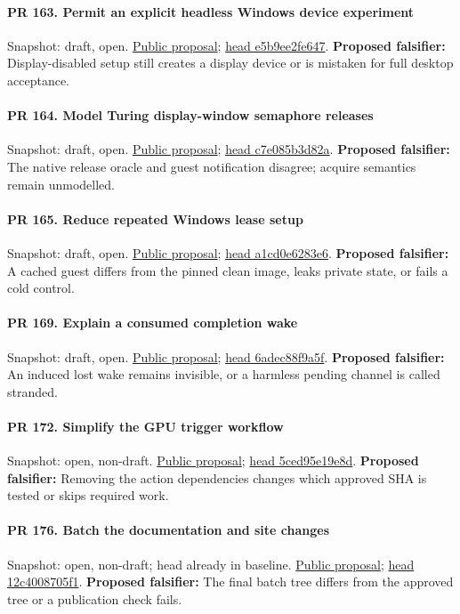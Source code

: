 \paragraph{PR 163. Permit an explicit headless Windows device experiment}
\readcode Snapshot: draft, open.
\href{\repobase/pull/163}{Public proposal};
\href{\repobase/commit/e5b9ee2fe647834f9dc141540c64c9792f884b89}{head e5b9ee2fe647}.
\textbf{Proposed falsifier:} Display-disabled setup still creates a display device or is mistaken
  for full desktop acceptance.

\paragraph{PR 164. Model Turing display-window semaphore releases}
\readcode Snapshot: draft, open.
\href{\repobase/pull/164}{Public proposal};
\href{\repobase/commit/c7e085b3d82a6ff01561887c3530eb47d5133bfc}{head c7e085b3d82a}.
\textbf{Proposed falsifier:} The native release oracle and guest notification disagree; acquire
  semantics remain unmodelled.

\paragraph{PR 165. Reduce repeated Windows lease setup}
\readcode Snapshot: draft, open.
\href{\repobase/pull/165}{Public proposal};
\href{\repobase/commit/a1cd0e6283e6261d56164089ce5dac2a6251f4fd}{head a1cd0e6283e6}.
\textbf{Proposed falsifier:} A cached guest differs from the pinned clean image, leaks private
  state, or fails a cold control.

\paragraph{PR 169. Explain a consumed completion wake}
\readcode Snapshot: draft, open.
\href{\repobase/pull/169}{Public proposal};
\href{\repobase/commit/6adec88f9a5f0b847084fbcc8f3d0365b49faa0a}{head 6adec88f9a5f}.
\textbf{Proposed falsifier:} An induced lost wake remains invisible, or a harmless pending channel
  is called stranded.

\paragraph{PR 172. Simplify the GPU trigger workflow}
\readcode Snapshot: open, non-draft.
\href{\repobase/pull/172}{Public proposal};
\href{\repobase/commit/5ced95e19e8dc6df4a996470703e996d642da0d3}{head 5ced95e19e8d}.
\textbf{Proposed falsifier:} Removing the action dependencies changes which approved SHA is tested
  or skips required work.

\paragraph{PR 176. Batch the documentation and site changes}
\readcode Snapshot: open, non-draft; head already in baseline.
\href{\repobase/pull/176}{Public proposal};
\href{\repobase/commit/12c4008705f17033a803e56d4d479bf1275cdb94}{head 12c4008705f1}.
\textbf{Proposed falsifier:} The final batch tree differs from the approved tree or a publication
  check fails.

